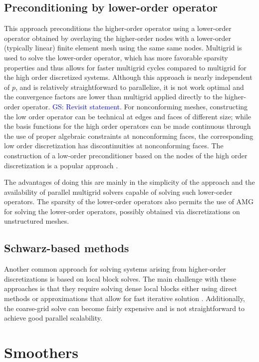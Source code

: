 \documentclass[times]{nlaauth}
\newcommand{\gsnote}[1]{\textcolor{blue}{GS: #1}}
\begin{document}
\subsection{Preconditioning by lower-order operator}
This approach preconditions the higher-order operator using a
lower-order operator obtained by overlaying the higher-order nodes
with a lower-order (typically linear) finite element mesh using the
same same nodes.  Multigrid is used to solve the lower-order operator,
which has more favorable sparsity properties and thus allows for
faster multigrid cycles compared to multigrid for the high order
discretized systems.  Although this approach is nearly independent of
$p$, and is relatively straightforward to parallelize, it is not work
optimal and the convergence factors are lower than multigrid applied
directly to the higher-order operator. \gsnote{Revisit statement.}
For nonconforming meshes, constructing the low order operator can be
technical at edges and faces of different size; while the basis
functions for the high order operators can be made continuous through
the use of proper algebraic constraints at nonconforming faces, the
corresponding low order discretization has discontinuities at
nonconforming faces.  The construction of a low-order preconditioner
based on the nodes of the high order discretization is a popular
approach \cite{Brown10,Kim07,DevilleMund?}.

The advantages of doing
this are mainly in the simplicity of the approach and the availability
of parallel multigrid solvers capable of solving such lower-order
operators. The sparsity of the lower-order operators also permits the
use of AMG for solving the lower-order operators, possibly obtained
via discretizations on unstructured meshes.


\subsection{Schwarz-based methods}
Another common approach for solving systems arising from higher-order
discretizations is based on local block solves.  The main challenge
with these approaches is that they require solving dense local blocks
either using direct methods or approximations that allow for fast
iterative solution \cite{LottesFischer05,FischerLottes05}.
Additionally, the coarse-grid solve can become fairly expensive and is
not straightforward to achieve good parallel scalability.


\section{Smoothers}
\end{document}

